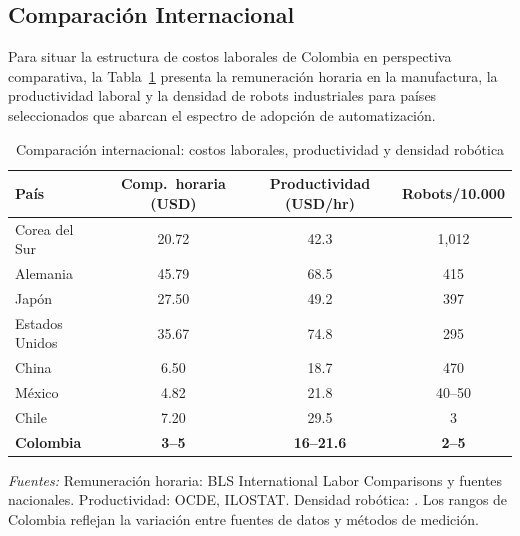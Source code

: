 \documentclass{article}
\begin{document}
\subsection{Comparaci\'on Internacional}
\label{subsec:international_comparison}

Para situar la estructura de costos laborales de Colombia en perspectiva comparativa, la Tabla~\ref{tab:international_comparison} presenta la remuneraci\'on horaria en la manufactura, la productividad laboral y la densidad de robots industriales para pa\'ises seleccionados que abarcan el espectro de adopci\'on de automatizaci\'on.

\begin{table}[htbp]
\centering
\caption{Comparaci\'on internacional: costos laborales, productividad y densidad rob\'otica}
\label{tab:international_comparison}
\begin{threeparttable}
\begin{tabular}{lccc}
\toprule
\textbf{Pa\'is} & \textbf{Comp.\ horaria (USD)} & \textbf{Productividad (USD/hr)} & \textbf{Robots/10.000} \\
\midrule
Corea del Sur & 20.72 & 42.3 & 1,012 \\
Alemania & 45.79 & 68.5 & 415 \\
Jap\'on & 27.50 & 49.2 & 397 \\
Estados Unidos & 35.67 & 74.8 & 295 \\
China & 6.50 & 18.7 & 470 \\
M\'exico & 4.82 & 21.8 & 40--50 \\
Chile & 7.20 & 29.5 & 3 \\
\textbf{Colombia} & \textbf{3--5} & \textbf{16--21.6} & \textbf{2--5} \\
\bottomrule
\end{tabular}
\begin{tablenotes}
\small
\item \textit{Fuentes:} Remuneraci\'on horaria: BLS International Labor Comparisons y fuentes nacionales. Productividad: OCDE, ILOSTAT. Densidad rob\'otica: \cite{ifr2024}. Los rangos de Colombia reflejan la variaci\'on entre fuentes de datos y m\'etodos de medici\'on.
\end{tablenotes}
\end{threeparttable}
\end{table}
\end{document}
